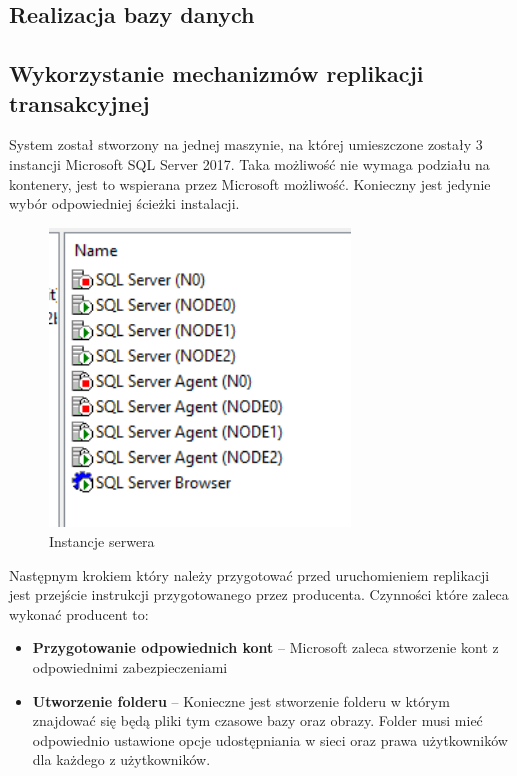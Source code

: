 \documentclass{article}
\begin{document}
	\subsection{Realizacja bazy danych}
	
	\subsection{Wykorzystanie mechanizmów replikacji transakcyjnej}
System został stworzony na jednej maszynie, na której umieszczone zostały 3 instancji Microsoft SQL Server 2017. Taka możliwość nie wymaga podziału na kontenery, jest to wspierana przez Microsoft możliwość. Konieczny jest jedynie wybór odpowiedniej ścieżki instalacji.
	
	\begin{figure}[hbt!]
		\includegraphics[width=8cm]{Files/Pictures/instancje}
		\centering
		\caption{Instancje serwera}
	\end{figure}
	

	
	Następnym krokiem który należy przygotować przed uruchomieniem replikacji jest przejście instrukcji przygotowanego przez producenta. Czynności które zaleca wykonać producent to:
	
	\begin{itemize}
	\item	\textbf{Przygotowanie odpowiednich kont} – Microsoft zaleca stworzenie kont z odpowiednimi zabezpieczeniami
	\item	\textbf{Utworzenie folderu} – Konieczne jest stworzenie folderu w którym znajdować się będą 	pliki tym czasowe bazy oraz obrazy. Folder musi mieć odpowiednio ustawione opcje udostępniania w sieci oraz prawa użytkowników dla każdego z użytkowników.
	\end{itemize}
	
\end{document}

